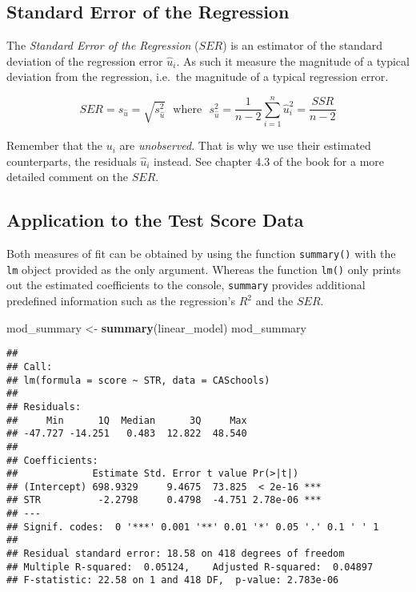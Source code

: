 \documentclass[]{book}
\newenvironment{Shaded}{\begin{snugshade}}{\end{snugshade}}
\newcommand{\KeywordTok}[1]{\textcolor[rgb]{0.13,0.29,0.53}{\textbf{#1}}}
\newcommand{\StringTok}[1]{\textcolor[rgb]{0.31,0.60,0.02}{#1}}
\newcommand{\NormalTok}[1]{#1}
\theoremstyle{definition}
\theoremstyle{definition}
\theoremstyle{definition}
\theoremstyle{remark}
\begin{document}
\subsection*{Standard Error of the
Regression}\label{standard-error-of-the-regression}

The \emph{Standard Error of the Regression} (\(SER\)) is an estimator of
the standard deviation of the regression error \(\hat{u}_i\). As such it
measure the magnitude of a typical deviation from the regression,
i.e.~the magnitude of a typical regression error.

\[ SER = s_{\hat{u}} = \sqrt{s_{\hat{u}}^2} \ \ \ \text{where} \ \ \ s_{\hat{u} }^2 = \frac{1}{n-2} \sum_{i = 1}^n \hat{u}^2_i = \frac{SSR}{n - 2} \]

Remember that the \(u_i\) are \emph{unobserved}. That is why we use
their estimated counterparts, the residuals \(\hat{u}_i\) instead. See
chapter 4.3 of the book for a more detailed comment on the \(SER\).

\subsection*{Application to the Test Score
Data}\label{application-to-the-test-score-data}

Both measures of fit can be obtained by using the function
\texttt{summary()} with the \texttt{lm} object provided as the only
argument. Whereas the function \texttt{lm()} only prints out the
estimated coefficients to the console, \texttt{summary} provides
additional predefined information such as the regression's \(R^2\) and
the \(SER\).

\begin{Shaded}
\begin{Highlighting}[]
\NormalTok{mod_summary <-}\StringTok{ }\KeywordTok{summary}\NormalTok{(linear_model)}
\NormalTok{mod_summary}
\end{Highlighting}
\end{Shaded}

\begin{verbatim}
## 
## Call:
## lm(formula = score ~ STR, data = CASchools)
## 
## Residuals:
##     Min      1Q  Median      3Q     Max 
## -47.727 -14.251   0.483  12.822  48.540 
## 
## Coefficients:
##             Estimate Std. Error t value Pr(>|t|)    
## (Intercept) 698.9329     9.4675  73.825  < 2e-16 ***
## STR          -2.2798     0.4798  -4.751 2.78e-06 ***
## ---
## Signif. codes:  0 '***' 0.001 '**' 0.01 '*' 0.05 '.' 0.1 ' ' 1
## 
## Residual standard error: 18.58 on 418 degrees of freedom
## Multiple R-squared:  0.05124,    Adjusted R-squared:  0.04897 
## F-statistic: 22.58 on 1 and 418 DF,  p-value: 2.783e-06
\end{verbatim}
\end{document}
